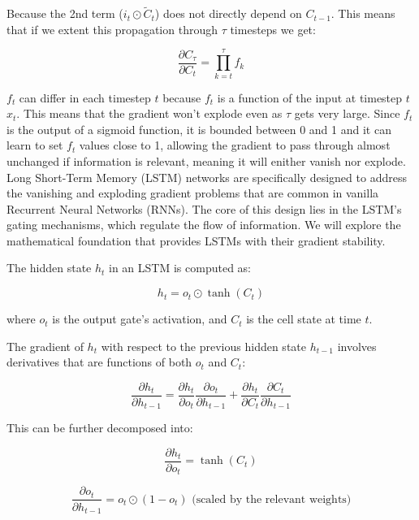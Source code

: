 \documentclass[12pt]{article}
\begin{document}
Because the 2nd term (\(i_t \odot \tilde{C}_t\)) does not directly depend on \(C_{t-1}\). This means that if we extent this propagation through \(\tau\) timesteps we get: 

\[\frac{\partial C_\tau}{\partial C_{t}} = \prod_{k=t}^\tau f_k\]

\(f_t\) can differ in each timestep \(t\) because \(f_t\) is a function of the input at timestep \(t\) \(x_t\). This means that the gradient won't explode even as \(\tau\) gets very large. Since \(f_t\) is the output of a sigmoid function, it is bounded between 0 and 1 and it can learn to set \(f_t\) values close to 1, allowing the gradient to pass through almost unchanged if information is relevant, meaning it will enither vanish nor explode. \\

Long Short-Term Memory (LSTM) networks are specifically designed to address the vanishing and exploding gradient problems that are common in vanilla Recurrent Neural Networks (RNNs). The core of this design lies in the LSTM's gating mechanisms, which regulate the flow of information. We will explore the mathematical foundation that provides LSTMs with their gradient stability.

The hidden state \( h_t \) in an LSTM is computed as:

\begin{equation}
h_t = o_t \odot \tanh(C_t)
\end{equation}

where \( o_t \) is the output gate's activation, and \( C_t \) is the cell state at time \( t \).

The gradient of \( h_t \) with respect to the previous hidden state \( h_{t-1} \) involves derivatives that are functions of both \( o_t \) and \( C_t \):

\begin{equation}
\frac{\partial h_t}{\partial h_{t-1}} = \frac{\partial h_t}{\partial o_t} \frac{\partial o_t}{\partial h_{t-1}} + \frac{\partial h_t}{\partial C_t} \frac{\partial C_t}{\partial h_{t-1}}
\end{equation}

This can be further decomposed into:

\begin{equation}
\frac{\partial h_t}{\partial o_t} = \tanh(C_t)
\end{equation}

\begin{equation}
\frac{\partial o_t}{\partial h_{t-1}} = o_t \odot (1 - o_t) \text{ (scaled by the relevant weights)}
\end{equation}
\end{document}
